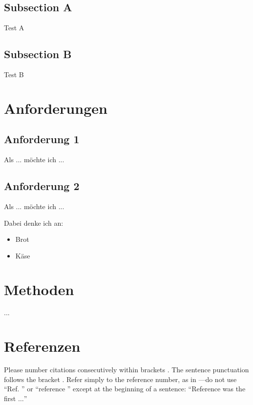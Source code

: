 \documentclass[conference]{IEEEtran}
\begin{document}
\subsection{Subsection A}

Test A

\subsection{Subsection B}

Test B

\section{Anforderungen}

\subsection{Anforderung 1}

Als ... möchte ich ...

\subsection{Anforderung 2}

Als ... möchte ich ...

Dabei denke ich an:

\begin{itemize}
	\item Brot
	\item Käse
\end{itemize}





\section{Methoden}

...





\section*{Referenzen}

Please number citations consecutively within brackets \cite{b1}. The 
sentence punctuation follows the bracket \cite{b2}. Refer simply to the reference 
number, as in \cite{b3}---do not use ``Ref. \cite{b3}'' or ``reference \cite{b3}'' except at 
the beginning of a sentence: ``Reference \cite{b3} was the first $\ldots$''
\end{document}
